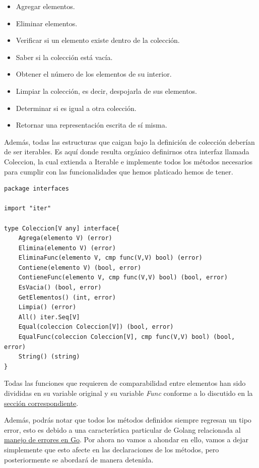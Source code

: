 \documentclass[11pt]{article}
\begin{document}
\begin{itemize}
\item Agregar elementos.
\item Eliminar elementos.
\item Verificar si un elemento existe dentro de la colección.
\item Saber si la colección está vacía.
\item Obtener el número de los elementos de su interior.
\item Limpiar la colección, es decir, despojarla de sus elementos.
\item Determinar si es igual a otra colección.
\item Retornar una representación escrita de sí misma.
\end{itemize}

Además, todas las estructuras que caigan bajo la definición de colección deberían de ser iterables. Es aquí donde resulta orgánico definirnos otra interfaz llamada Coleccion, la cual extienda a Iterable e implemente todos los métodos necesarios para cumplir con las funcionalidades que hemos platicado hemos de tener.

\begin{verbatim}
package interfaces

import "iter"

type Coleccion[V any] interface{
	Agrega(elemento V) (error)
	Elimina(elemento V) (error)
	EliminaFunc(elemento V, cmp func(V,V) bool) (error)
	Contiene(elemento V) (bool, error)
	ContieneFunc(elemento V, cmp func(V,V) bool) (bool, error)
	EsVacia() (bool, error)
	GetElementos() (int, error)
	Limpia() (error)
	All() iter.Seq[V]
	Equal(coleccion Coleccion[V]) (bool, error)
	EqualFunc(coleccion Coleccion[V], cmp func(V,V) bool) (bool, error)
	String() (string)
}

\end{verbatim}

Todas las funciones que requieren de comparabilidad entre elementos han sido divididas en su variable original y su variable \emph{Func} conforme a lo discutido en la \hyperref[sec:org3327f01]{sección correspondiente}.

Además, podrás notar que todos los métodos definidos siempre regresan un tipo error, esto es debido a una característica particular de Golang relacionada al \href{https://go.dev/blog/error-handling-and-go}{manejo de errores en Go}. Por ahora no vamos a ahondar en ello, vamos a dejar simplemente que esto afecte en las declaraciones de los métodos, pero posteriormente se abordará de manera detenida.
\end{document}
